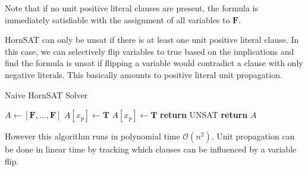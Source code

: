\begin{enumerate}[label=(\alph*)]
    Note that if no unit positive literal clauses are present, the formula is immediately satisfiable with the assignment of all variables to $\mathbf{F}$.

    HornSAT can only be unsat if there is at least one unit positive literal clause. In this case, we can selectively flip variables to true based on the implications and find the formula is unsat if flipping a variable would contradict a clause with only negative literals. This basically amounts to positive literal unit propagation.

    \begin{algorithm}[H]
      \caption{Naive HornSAT Solver}
      \begin{algorithmic}[1]
           
              \State $A\gets [\mathbf{F}, \dots, \mathbf{F}]$
               
                  \State $A[x_p] \gets \mathbf{T}$
                  \State $A[x_p] \gets \mathbf{T}$
                  \State \textbf{return} UNSAT
                \EndIf
              \EndWhile
              \State \textbf{return} $A$
          \EndProcedure
      \end{algorithmic}
    \end{algorithm}

    However this algorithm runs in polynomial time $\mathcal{O}(n^2)$. Unit propagation can be done in linear time by tracking which clauses can be influenced by a variable flip.


\end{enumerate}
